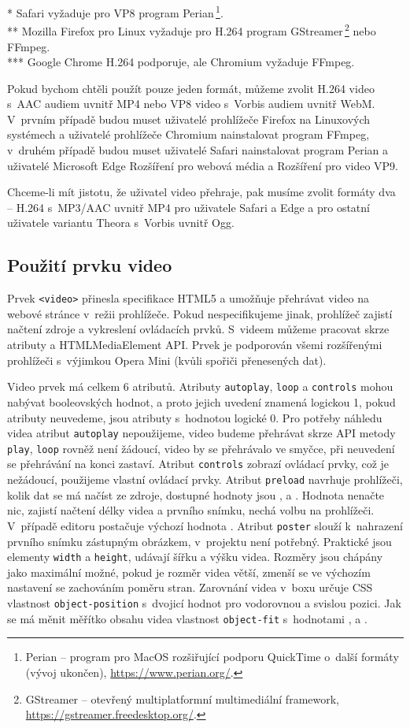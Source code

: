 * Safari vyžaduje pro VP8 program Perian\,\footnote{Perian -- program pro MacOS rozšiřující podporu QuickTime o~další formáty (vývoj ukončen), \url{https://www.perian.org/}.}.\\
** Mozilla Firefox pro Linux vyžaduje pro H.264 program GStreamer\,\footnote{GStreamer -- otevřený multiplatformní multimediální framework, \url{https://gstreamer.freedesktop.org/}.} nebo FFmpeg.\\
*** Google Chrome H.264 podporuje, ale Chromium vyžaduje FFmpeg.
\medskip

Pokud bychom chtěli použít pouze jeden formát, můžeme zvolit H.264 video s~AAC audiem uvnitř MP4 nebo VP8 video s~Vorbis audiem uvnitř WebM. V~prvním případě budou muset uživatelé prohlížeče Firefox na Linuxových systémech a uživatelé prohlížeče Chromium nainstalovat program FFmpeg, v~druhém případě budou muset uživatelé Safari nainstalovat program Perian a uživatelé Microsoft Edge Rozšíření pro webová média a Rozšíření pro video VP9.

Chceme-li mít jistotu, že uživatel video přehraje, pak musíme zvolit formáty dva -- H.264 s~MP3/AAC uvnitř MP4 pro uživatele Safari a Edge a pro ostatní uživatele variantu Theora s~Vorbis uvnitř Ogg.

\subsection{Použití prvku video}
Prvek \texttt{<video>} přinesla specifikace HTML5 a umožňuje přehrávat video na webové stránce v~režii prohlížeče. Pokud nespecifikujeme jinak, prohlížeč zajistí načtení zdroje a vykreslení ovládacích prvků. S~videem můžeme pracovat skrze atributy a HTMLMediaElement API. Prvek je podporován všemi rozšířenými prohlížeči s~výjimkou Opera Mini (kvůli spořiči přenesených dat).

Video prvek má celkem 6 atributů. Atributy \texttt{autoplay}, \texttt{loop} a \texttt{controls} mohou nabývat booleovských hodnot, a proto jejich uvedení znamená logickou 1, pokud atributy neuvedeme, jsou atributy s~hodnotou logické 0. Pro potřeby náhledu videa atribut \texttt{autoplay} nepoužijeme, video budeme přehrávat skrze API metody \texttt{play}, \texttt{loop} rovněž není žádoucí, video by se přehrávalo ve smyčce, při neuvedení se přehrávání na konci zastaví. Atribut \texttt{controls} zobrazí ovládací prvky, což je nežádoucí, použijeme vlastní ovládací prvky. Atribut \texttt{preload} navrhuje prohlížeči, kolik dat se má načíst ze zdroje, dostupné hodnoty jsou ,  a . Hodnota  nenačte nic,  zajistí načtení délky videa a prvního snímku,  nechá volbu na prohlížeči. V~případě editoru postačuje výchozí hodnota . Atribut \texttt{poster} slouží k~nahrazení prvního snímku zástupným obrázkem, v~projektu není potřebný. Praktické jsou elementy \texttt{width} a \texttt{height}, udávají šířku a výšku videa. Rozměry jsou chápány jako maximální možné, pokud je rozměr videa větší, zmenší se ve výchozím nastavení se zachováním poměru stran. Zarovnání videa v~boxu určuje CSS vlastnost \texttt{object-position} s~dvojicí hodnot pro vodorovnou a svislou pozici. Jak se má měnit měřítko obsahu videa vlastnost \texttt{object-fit} s~hodnotami ,  a .

